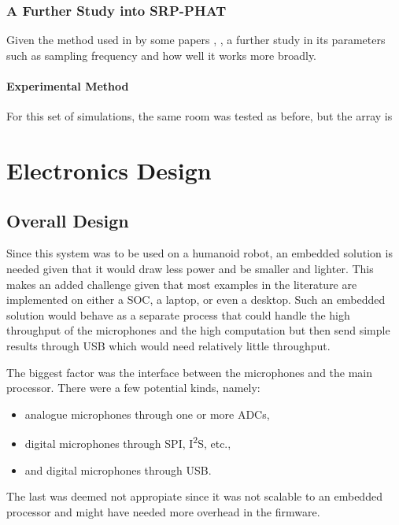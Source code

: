 \documentclass[notitlepage]{report}
\begin{document}
\subsection{A Further Study into SRP-PHAT}

Given the method used in by some papers \cite{valin_localization_2004}, \cite{valin_robust_2007}, a further study in its parameters such as sampling frequency and how well it works more broadly.

\subsubsection{Experimental Method}

For this set of simulations, the same room was tested as before, but the array is 

\subs

\chapter{Electronics Design}

\section{Overall Design}

Since this system was to be used on a humanoid robot, an embedded solution is needed given that it would draw less power and be smaller and lighter. This makes an added challenge given that most examples in the literature are implemented on either a SOC, a laptop, or even a desktop. Such an embedded solution would behave as a separate process that could handle the high throughput of the microphones and the high computation but then send simple results through USB which would need relatively little throughput.

The biggest factor was the interface between the microphones and the main processor. There were a few potential kinds, namely:
\begin{itemize}
	\item analogue microphones through one or more ADCs,
	\item digital microphones through SPI, I\textsuperscript{2}S, etc.,
	\item and digital microphones through USB.
\end{itemize}
The last was deemed not appropiate since it was not scalable to an embedded processor and might have needed more overhead in the firmware.
\end{document}
